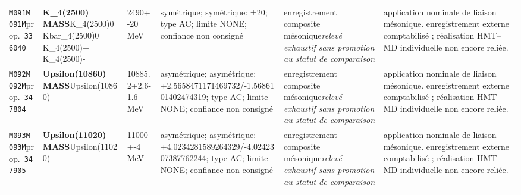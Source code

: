\begin{landscape}
\begin{longtable}{L{1.85cm}L{4.45cm}L{2.35cm}L{4.05cm}L{3.35cm}L{7.15cm}}
\texttt{M091}\newline \texttt{M091M}\newline prop.\ \texttt{336040} & \textbf{K\_\allowbreak{}4(2500) MASS}\newline K\_\allowbreak{}4(2500)0 \textbar{}\allowbreak{} Kbar\_\allowbreak{}4(2500)0 \textbar{}\allowbreak{} K\_\allowbreak{}4(2500)+ \textbar{}\allowbreak{} K\_\allowbreak{}4(2500)- & 2490+-20\,MeV & symétrique; symétrique: ±20; type AC; limite NONE; confiance non consigné & enregistrement composite mésonique\newline \emph{relevé exhaustif sans promotion au statut de comparaison} & application nominale de liaison mésonique. enregistrement externe comptabilisé ; réalisation HMT--MD individuelle non encore reliée. \\
\texttt{M092}\newline \texttt{M092M}\newline prop.\ \texttt{347804} & \textbf{Upsilon(10860) MASS}\newline Upsilon(10860) & 10885.2+2.6-1.6\,MeV & asymétrique; asymétrique: +2.5658471171469732/-1.5686101402474319; type AC; limite NONE; confiance non consigné & enregistrement composite mésonique\newline \emph{relevé exhaustif sans promotion au statut de comparaison} & application nominale de liaison mésonique. enregistrement externe comptabilisé ; réalisation HMT--MD individuelle non encore reliée. \\
\texttt{M093}\newline \texttt{M093M}\newline prop.\ \texttt{347905} & \textbf{Upsilon(11020) MASS}\newline Upsilon(11020) & 11000+-4\,MeV & asymétrique; asymétrique: +4.0234281589264329/-4.0242307387762244; type AC; limite NONE; confiance non consigné & enregistrement composite mésonique\newline \emph{relevé exhaustif sans promotion au statut de comparaison} & application nominale de liaison mésonique. enregistrement externe comptabilisé ; réalisation HMT--MD individuelle non encore reliée. \\

\end{longtable}
\end{landscape}
